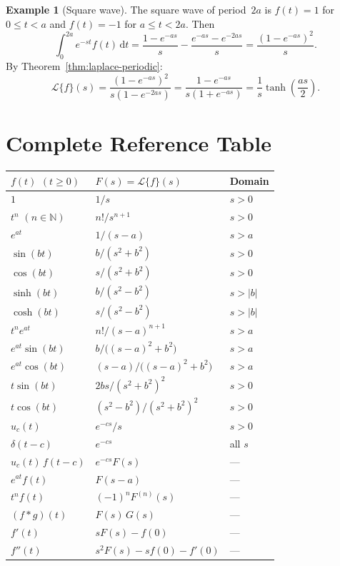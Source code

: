 \documentclass[12pt,a4paper,openany]{book}
\theoremstyle{definition}
\newtheorem{example}[definition]{Example}
\theoremstyle{plain}
\theoremstyle{remark}
\newcommand{\N}{\mathbb{N}}
\newcommand{\dd}{\mathrm{d}}
\newcommand{\abs}[1]{\left|#1\right|}
\begin{document}
\begin{example}[Square wave]
\label{ex:square-wave}
The square wave of period~\(2a\) is \(f(t)=1\) for \(0\le t<a\) and
\(f(t)=-1\) for \(a\le t<2a\). Then
\[
  \int_0^{2a} e^{-st}f(t)\,\dd t
  = \frac{1-e^{-as}}{s} - \frac{e^{-as}-e^{-2as}}{s}
  = \frac{(1-e^{-as})^2}{s}.
\]
By Theorem~\ref{thm:laplace-periodic}:
\[
  \mathcal{L}\{f\}(s) = \frac{(1-e^{-as})^2}{s(1-e^{-2as})}
  = \frac{1-e^{-as}}{s(1+e^{-as})}
  = \frac{1}{s}\tanh\!\left(\frac{as}{2}\right).
\]
\end{example}

\section{Complete Reference Table}
\label{sec:laplace-reference-table}

\begin{center}
\renewcommand{\arraystretch}{1.4}
\begin{tabular}{@{}lll@{}}
\toprule
\(f(t)\) \((t\ge 0)\) & \(F(s)=\mathcal{L}\{f\}(s)\) & Domain \\
\midrule
\(1\) & \(1/s\) & \(s>0\) \\
\(t^n\) \((n\in\N)\) & \(n!/s^{n+1}\) & \(s>0\) \\
\(e^{at}\) & \(1/(s-a)\) & \(s>a\) \\
\(\sin(bt)\) & \(b/(s^2+b^2)\) & \(s>0\) \\
\(\cos(bt)\) & \(s/(s^2+b^2)\) & \(s>0\) \\
\(\sinh(bt)\) & \(b/(s^2-b^2)\) & \(s>\abs{b}\) \\
\(\cosh(bt)\) & \(s/(s^2-b^2)\) & \(s>\abs{b}\) \\
\(t^n e^{at}\) & \(n!/(s-a)^{n+1}\) & \(s>a\) \\
\(e^{at}\sin(bt)\) & \(b/\bigl((s-a)^2+b^2\bigr)\) & \(s>a\) \\
\(e^{at}\cos(bt)\) & \((s-a)/\bigl((s-a)^2+b^2\bigr)\) & \(s>a\) \\
\(t\sin(bt)\) & \(2bs/(s^2+b^2)^2\) & \(s>0\) \\
\(t\cos(bt)\) & \((s^2-b^2)/(s^2+b^2)^2\) & \(s>0\) \\
\(u_c(t)\) & \(e^{-cs}/s\) & \(s>0\) \\
\(\delta(t-c)\) & \(e^{-cs}\) & all \(s\) \\
\(u_c(t)\,f(t-c)\) & \(e^{-cs}F(s)\) & --- \\
\(e^{at}f(t)\) & \(F(s-a)\) & --- \\
\(t^n f(t)\) & \((-1)^n F^{(n)}(s)\) & --- \\
\((f*g)(t)\) & \(F(s)\,G(s)\) & --- \\
\(f'(t)\) & \(sF(s)-f(0)\) & --- \\
\(f''(t)\) & \(s^2F(s)-sf(0)-f'(0)\) & --- \\
\bottomrule
\end{tabular}
\end{center}
\end{document}
